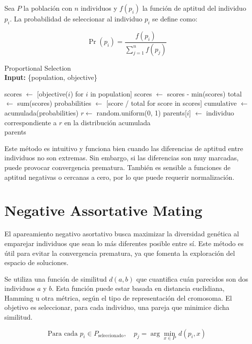 Sea $P$ la población con $n$ individuos y $f(p_i)$ la función de aptitud del individuo $p_i$. La probabilidad de seleccionar al individuo $p_i$ se define como:

\[
\Pr(p_i) = \frac{f(p_i)}{\sum_{j=1}^{n} f(p_j)}
\]

\begin{algorithm}[H]
	\caption{Proportional Selection \\ \textbf{Input:} \{population, objective\}}
	\begin{algorithmic}[1]
		\State scores $\gets$ [objective($i$) for $i$ in population]
		\State scores $\gets$ scores - min(scores) 
		\EndIf
		\State total $\gets$ sum(scores)
		\State probabilities $\gets$ [score / total for score in scores]
		\State cumulative $\gets$ acumulada(probabilities)
		\State $r \gets$ random.uniform(0, 1)
		\State parents[$i$] $\gets$ individuo correspondiente a $r$ en la distribución acumulada
		\EndFor \\
		\Return parents
	\end{algorithmic}
	\label{alg:proportional_selection}
\end{algorithm}

Este método es intuitivo y funciona bien cuando las diferencias de aptitud entre individuos no son extremas. Sin embargo, si las diferencias son muy marcadas, puede provocar convergencia prematura. También es sensible a funciones de aptitud negativas o cercanas a cero, por lo que puede requerir normalización.

\section{Negative Assortative Mating}

El apareamiento negativo asortativo busca maximizar la diversidad genética al emparejar individuos que sean lo más diferentes posible entre sí. Este método es útil para evitar la convergencia prematura, ya que fomenta la exploración del espacio de soluciones.

Se utiliza una función de similitud $d(a, b)$ que cuantifica cuán parecidos son dos individuos $a$ y $b$. Esta función puede estar basada en distancia euclidiana, Hamming u otra métrica, según el tipo de representación del cromosoma. El objetivo es seleccionar, para cada individuo, una pareja que minimice dicha similitud.

\[
\text{Para cada } p_i \in P_{\text{seleccionado}},\quad p_j = \arg\min_{x \in P} \, d(p_i, x)
\]

